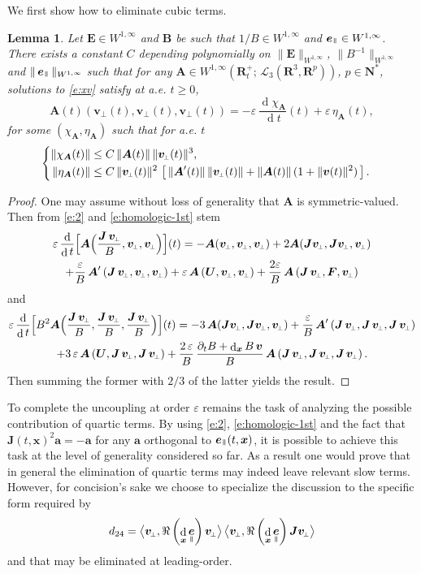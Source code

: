 \documentclass[JEP,XML,SOM,Unicode]{cedram}
\let\mathcal\mathscr
\newenvironment{splitcases}
{\begin{cases}\begin{aligned}}
{\end{aligned}\end{cases}}
\newcommand{\sperp}{{\scriptscriptstyle\perp}}
\newcommand{\blangle}{\bigl\langle}
\newcommand{\brangle}{\bigr\rangle}
\let\eps\varepsilon
\let\d\partial
\DeclareMathOperator\dD{d}\let\dd\dD
\theoremstyle{plain}
\newtheorem{lemma}[theorem]{Lemma}
\theoremstyle{definition}
\newcommand{\bl}{\begin{lemma}}
\newcommand{\el}{\end{lemma}}
\newcommand\R{\mathbf R}
\newcommand{\N}{\mathbf N}
\newcommand\bA{{\boldsymbol A}}
\newcommand\bB{{\boldsymbol B}}
\newcommand\bE{{\boldsymbol E}}
\newcommand\bF{{\boldsymbol F}}
\newcommand\bJ{{\boldsymbol J}}
\newcommand\bU{{\boldsymbol U}}
\newcommand\bfa{{\boldsymbol a}}
\newcommand\bfv{{\boldsymbol v}}
\newcommand\bfx{{\boldsymbol x}}
\newcommand\cL{{\mathcal L}}
\DeclareMathOperator{\beD}{\boldsymbol{e}}
\newcommand\eDpar{\beD_\mypar}
\newcommand\bvperp{\bfv_{\!\sperp}}
\newcommand{\mypar}{{\mkern3mu\vphantom{\perp}\vrule depth 0pt\mkern2mu\vrule depth 0pt\mkern3mu}}
\begin{document}
We first show how to eliminate cubic terms.
\bl
\label{3rd}
Let $\bE\in W^{1,\infty}$ and $\bB$ be such that $1/B\in W^{1,\infty}$
and $\eDpar\in W^{1,\infty}$. There exists a constant $C$ depending
polynomially on $\|\bE\|_{W^{1,\infty}}$, $\|B^{-1}\|_{W^{1,\infty}}$ and
$\|\eDpar\|_{W^{1,\infty}}$ such that for any $\bA\in
W^{1,\infty}\left(\R^+_t;\,\cL_3(\R^3,\R^p)\right)$, $p\in\N^*$,
solutions to \eqref{e:xv} satisfy at a.e. $t\geq 0$,
\[
\bA(t)(\bvperp(t),\bvperp(t),\bvperp(t))
=-\eps\,\frac{\dD\chi_\bA}{\dD t}(t)+\eps\,\eta_\bA(t),
\]
for some $(\chi_\bA,\eta_\bA)$ such that for a.e. $t$
\[
\begin{splitcases}
\|\chi_\bA(t)\|&\leq C\,\|\bA(t)\|\,\|\bvperp(t)\|^3,
\\
\|\eta_\bA(t)\|&\leq C\,\|\bvperp(t)\|^2\,\left[\,\|\bA'(t)\|\,\|\bvperp(t)\|
+\|\bA(t)\|\,(1+\|\bfv(t)\|^2)\,\right].
\end{splitcases}
\]
\el
\begin{proof}
One may assume without loss of generality that $\bA$ is symmetric-valued. Then from \eqref{e:2} and \eqref{e:homologic-1st} stem
\begin{multline*}
\eps\,\frac{\dD}{\dD t}\Bigl[\bA\Bigl(\frac{\bJ\,\bvperp}{B},\bvperp,\bvperp\Bigr)\Bigr](t)
=-\bA(\bvperp,\bvperp,\bvperp)+2\bA(\bJ\bvperp,\bJ\bvperp,\bvperp)
\\+\frac{\eps}{B}\,\bA'\left(\bJ\,\bvperp,\bvperp,\bvperp\right)
+\eps\,\bA\left(\bU,\bvperp,\bvperp\right)+\frac{2\eps}{B}\,\bA\left(\bJ\,\bvperp,\bF,\bvperp\right)
\end{multline*}
and
\begin{multline*}
\eps\,\frac{\dD}{\dD t}\Bigl[ B^2
\bA\Bigl(\frac{\bJ\,\bvperp}{B},\frac{\bJ\,\bvperp}{B},\frac{\bJ\,\bvperp}{B}\Bigr)\Bigr](t)=-3\,\bA(\bJ\bvperp,\bJ\bvperp,\bvperp)
+\frac{\eps}{B}\,\bA'\left(\bJ\,\bvperp,\bJ\,\bvperp,\bJ\,\bvperp\right)
\\
+3\,\eps\,\bA\left(\bU,\bJ\,\bvperp,\bJ\,\bvperp\right)
+\frac{2\,\eps}{B}\,\frac{\d_tB+\dD_\bfx B\,\bfv}{B}\,\bA\left(\bJ\,\bvperp,\bJ\,\bvperp,\bJ\,\bvperp\right).
\end{multline*}
Then summing the former with $2/3$ of the latter yields the result.
\end{proof}

To complete the uncoupling at order $\eps$ remains the task of analyzing the possible contribution of quartic terms. By using \eqref{e:2}, \eqref{e:homologic-1st} and the fact that $\bJ(t,\bfx)^2\bfa=-\bfa$ for any $\bfa$ orthogonal to $\eDpar(t,\bfx)$, it is possible to achieve this task at the level of generality considered so far. As a result one would prove that in general the elimination of quartic terms may indeed leave relevant slow terms. However, for concision's sake we choose to specialize the discussion to the specific form required by
\[
d_{24}=\blangle \bvperp ,
\Re\left(\dD_{\bfx}\eDpar\right)\bvperp \brangle\,\blangle \bvperp,
\Re\left(\dD_\bfx \eDpar\right)\bJ\bvperp\brangle
\]
and that may be eliminated at leading-order.
\end{document}

